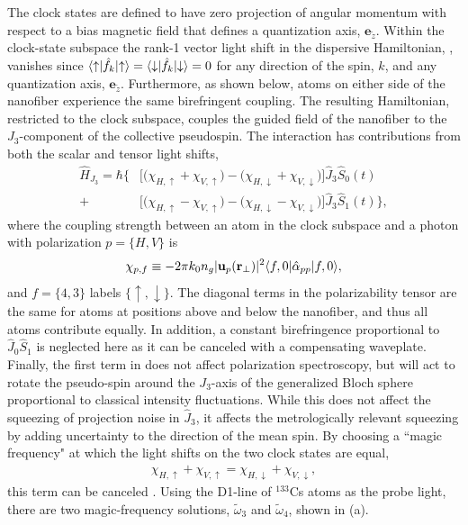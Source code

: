 \documentclass[preprint, aps,pra,onecolumn]{revtex4-1} %
\newcommand{\jz}{\hat{J}_3}
\newcommand{\magic}[1]{\tilde{\omega}_{#1}}
\begin{document}
The clock states are defined to have zero projection of angular momentum with respect to a bias magnetic field that defines a quantization axis, $\mathbf{e}_{\tilde{z}}$.  
Within the clock-state subspace the rank-1 vector light shift in the dispersive Hamiltonian, , vanishes since $\langle{\uparrow}\rvert\hat{f}_k \lvert{\uparrow}\rangle =\langle{\downarrow}\rvert\hat{f}_k \lvert{\downarrow}\rangle = 0$ for any direction of the spin, $k$, and any quantization axis, $\mathbf{e}_{\tilde{z}}$. 
Furthermore, as shown below, atoms on either side of the nanofiber experience the same birefringent coupling. 
The resulting Hamiltonian, restricted to the clock subspace, couples the guided field of the nanofiber to the $J_3$-component of the collective pseudospin. The interaction has contributions from both the scalar and tensor light shifts,
	\begin{align} \label{Eq::ClockHamiltonian}
		\hat{H}_{J_3} = \hbar \Big\{ & \big[ \big( \chi_{H,\uparrow} +\chi_{V,\uparrow} \big) - \big( \chi_{H,\downarrow} + \chi_{V,\downarrow}\big) \big] \jz \hat{S}_0(t) \\
		+ & \big[  \big( \chi_{H, \uparrow} - \chi_{V,\uparrow} \big) - \big(\chi_{H,\downarrow} - \chi_{V,\downarrow} \big) \big]  \jz \hat{S}_1(t) \Big\}, \nonumber
	\end{align}
where the coupling strength between an atom in the clock subspace and a photon with polarization $p = \{H,V\}$ is
	\begin{equation} \label{Eq::ClockCouplingStrength}
		\chi_{p,f} \equiv - 2\pi k_0 n_g  | \mathbf{u}_p(\mathbf{r}_\perp)|^2 \langle{f,0}\rvert\hat{\alpha}_{pp}  \lvert{f,0}\rangle,
	\end{equation}
and $f = \{4,3\}$ labels $\{\uparrow,\downarrow\}$.  
The diagonal terms in the polarizability tensor are the same for atoms at positions above and below the nanofiber, and thus all atoms contribute equally. 
In addition, a constant birefringence proportional to $ \hat{J}_0\hat{S}_1 $ is neglected here as it can be canceled with a compensating waveplate. 
Finally, the first term in  does not affect polarization spectroscopy, but will act to rotate the pseudo-spin around the $J_3$-axis of the generalized Bloch sphere proportional to classical intensity fluctuations.
While this does not affect the squeezing of projection noise in $\hat{J}_3$, it affects the metrologically relevant squeezing by adding uncertainty to the direction of the mean spin.  By choosing a ``magic frequency" at which the light shifts on the two clock states are equal, 
	\begin{align} \label{Eq::MagicWavelengthCondition}
		\chi_{H,\uparrow} +\chi_{V,\uparrow}  = \chi_{H,\downarrow} + \chi_{V,\downarrow},
	\end{align}
this term can be canceled \cite{chaudhury_continuous_2006}.
Using the D1-line of $^{133}$Cs atoms as the probe light, there are two magic-frequency solutions, $ \magic{3} $ and $\magic{4}$, shown in (a).  
\end{document}
